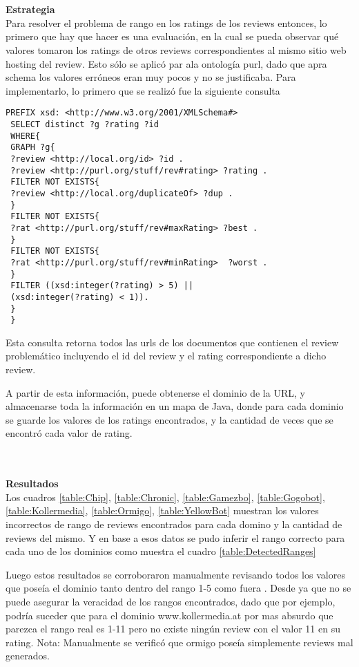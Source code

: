 ~\\\\\textbf{Estrategia}\\
Para resolver el problema de rango en los ratings de los reviews entonces, lo primero que hay que hacer es una evaluación, en la cual 
se pueda observar qué valores tomaron los ratings de otros reviews correspondientes al mismo sitio web hosting del review. 
Esto sólo se aplicó par ala ontología purl, dado que apra schema los valores erróneos eran muy pocos y no se justificaba.
Para implementarlo, lo primero que se realizó fue la siguiente consulta

\begin{lstlisting}[frame=single]
 PREFIX xsd: <http://www.w3.org/2001/XMLSchema#> 
 SELECT distinct ?g ?rating ?id 
 WHERE{
 GRAPH ?g{
 ?review <http://local.org/id> ?id .
 ?review <http://purl.org/stuff/rev#rating> ?rating .
 FILTER NOT EXISTS{
 ?review <http://local.org/duplicateOf> ?dup .
 }
 FILTER NOT EXISTS{
 ?rat <http://purl.org/stuff/rev#maxRating> ?best .
 }
 FILTER NOT EXISTS{
 ?rat <http://purl.org/stuff/rev#minRating>  ?worst .
 }
 FILTER ((xsd:integer(?rating) > 5) ||
 (xsd:integer(?rating) < 1)).
 }
 }
\end{lstlisting}

Esta consulta retorna todos las urls de los documentos que contienen el review problemático incluyendo el id del review y el 
rating correspondiente a dicho review.

A partir de esta información, puede obtenerse el dominio de la URL, y almacenarse toda la información en un mapa de Java, donde para cada dominio se 
guarde los valores de los ratings encontrados, y la cantidad de veces que se encontró cada valor de rating.

~\\\\\textbf{Resultados}\\
Los cuadros \ref{table:Chip}, \ref{table:Chronic}, \ref{table:Gamezbo}, \ref{table:Gogobot}, \ref{table:Kollermedia}, \ref{table:Ormigo}, \ref{table:YellowBot} muestran 
los valores incorrectos de rango de reviews encontrados para cada domino y la cantidad de reviews del mismo. Y en base a esos datos 
se pudo inferir el rango correcto para cada uno de los dominios como muestra el cuadro \ref{table:DetectedRanges}




Luego estos resultados se corroboraron manualmente revisando todos los valores que poseía el dominio tanto dentro del rango 1-5 como fuera .
Desde ya que no se puede asegurar la veracidad de los rangos encontrados, dado que por ejemplo, podría suceder que para el dominio 
www.kollermedia.at por mas absurdo que parezca el rango real es 1-11 pero no existe ningún review con el valor 11 en su rating.
Nota: Manualmente se verificó que ormigo poseía simplemente reviews mal generados.

